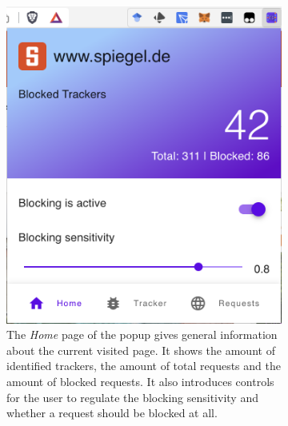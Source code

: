 \begin{figure}[ht!]  
  \centering
  \begin{subfigure}[b]{.30\textwidth}
      \centering
      \includegraphics[width=\linewidth ]{images/Home.png}
      \caption{The \emph{Home} page of the popup gives general information about the current visited page. It shows the amount
      of identified trackers, the amount of total requests and the amount of blocked requests. It also introduces controls
    for the user to regulate the blocking sensitivity and whether a request should be blocked at all.}
      \label{fig:Home}
  \end{subfigure}
  \hfill
  \begin{subfigure}[b]{.30\textwidth}
      \centering

\end{subfigure}
\end{figure}
